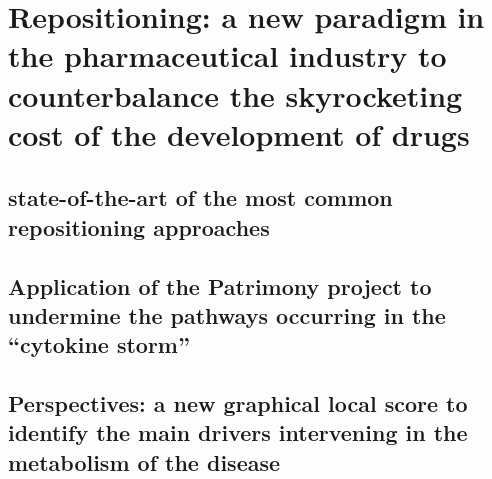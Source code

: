\chapter{Repositioning: a new paradigm in the pharmaceutical industry to counterbalance the skyrocketing cost of the development of drugs}

\section{state-of-the-art of the most common repositioning approaches}

\section{Application of the Patrimony project to undermine the pathways occurring in the \enquote{cytokine storm}}

\section{Perspectives: a new graphical local score to identify the main drivers intervening in the metabolism of the disease}